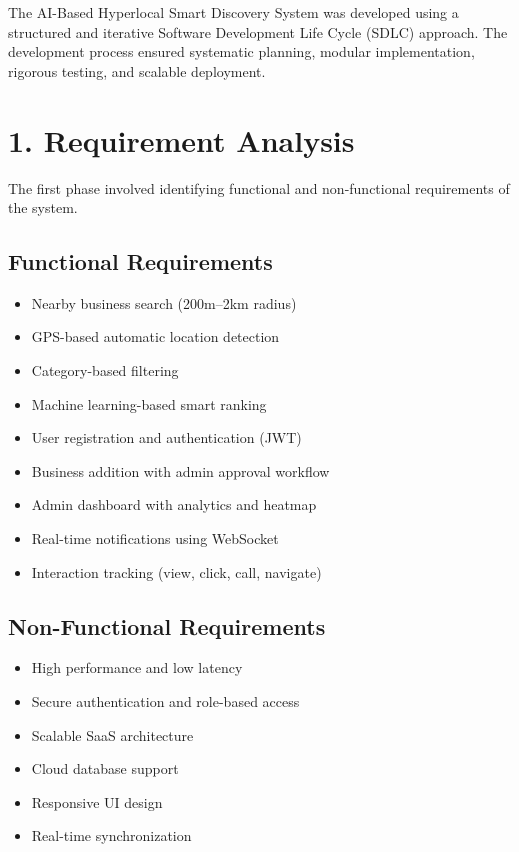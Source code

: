 \documentclass[12pt,a4paper]{report}
\begin{document}
The AI-Based Hyperlocal Smart Discovery System was developed using a structured and iterative Software Development Life Cycle (SDLC) approach. The development process ensured systematic planning, modular implementation, rigorous testing, and scalable deployment.

\section{1. Requirement Analysis}

The first phase involved identifying functional and non-functional requirements of the system.

\subsection*{Functional Requirements}

\begin{itemize}

\item Nearby business search (200m--2km radius)

\item GPS-based automatic location detection

\item Category-based filtering

\item Machine learning-based smart ranking

\item User registration and authentication (JWT)

\item Business addition with admin approval workflow

\item Admin dashboard with analytics and heatmap

\item Real-time notifications using WebSocket

\item Interaction tracking (view, click, call, navigate)

\end{itemize}

\subsection*{Non-Functional Requirements}

\begin{itemize}

\item High performance and low latency

\item Secure authentication and role-based access

\item Scalable SaaS architecture

\item Cloud database support

\item Responsive UI design

\item Real-time synchronization

\end{itemize}
\end{document}
